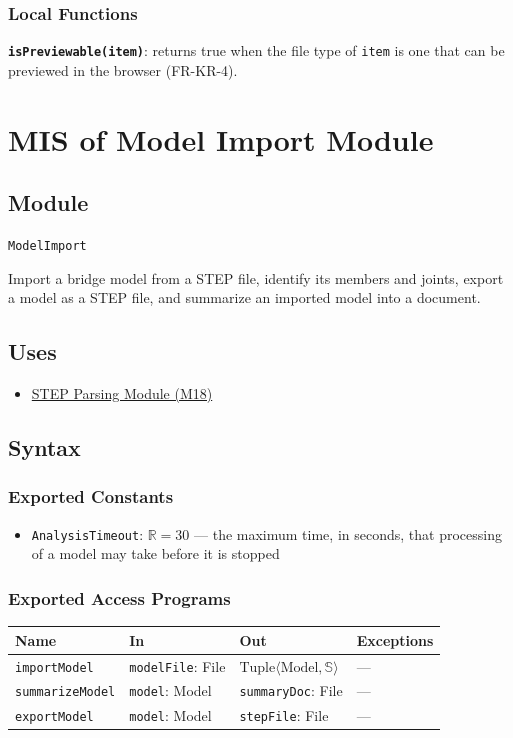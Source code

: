 \documentclass[12pt, titlepage]{article}
\begin{document}
\subsubsection{Local Functions}
\textbf{\texttt{isPreviewable(item)}}: returns true when the file type of \texttt{item} is one that can be previewed in the browser (FR-KR-4).

\newpage

\section{MIS of Model Import Module} \label{mModelImport}

\subsection{Module}
\texttt{ModelImport}

Import a bridge model from a STEP file, identify its members and joints, export a model as a STEP file, and summarize an imported model into a document.

\subsection{Uses}
\begin{itemize}
  \item \hyperref[mStep]{STEP Parsing Module (M18)}
\end{itemize}

\subsection{Syntax}

\subsubsection{Exported Constants}
\begin{itemize}
  \item \texttt{Analysis\allowbreak Timeout}: $\mathbb{R} = 30$ --- %
  the maximum time, in seconds, that processing of a model may take before it is stopped
\end{itemize}

\subsubsection{Exported Access Programs}
\begin{tabularx}{\textwidth}{p{3.2cm} p{3.8cm} p{3.6cm} X}
\toprule
\textbf{Name} & \textbf{In} & \textbf{Out} & \textbf{Exceptions} \\
\midrule
\texttt{importModel} & \texttt{modelFile}: File & $\text{Tuple}\langle \text{Model}, \mathbb{S} \rangle$ & --- \\
\texttt{summarizeModel} & \texttt{model}: Model & \texttt{summaryDoc}: File & --- \\
\texttt{exportModel} & \texttt{model}: Model & \texttt{stepFile}: File & --- \\
\bottomrule
\end{tabularx}
\end{document}
